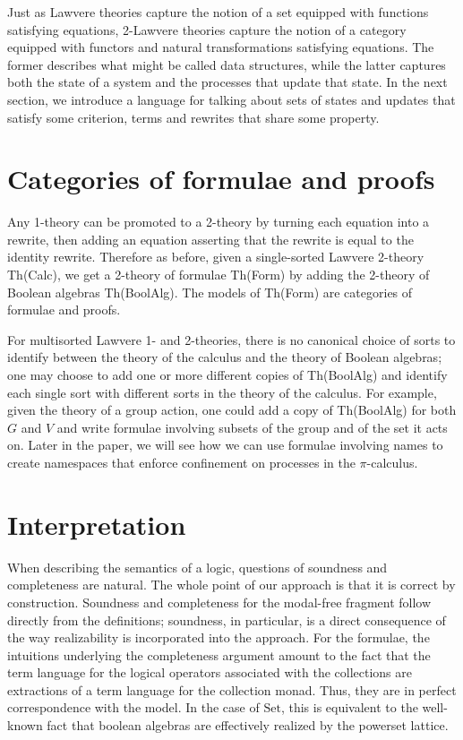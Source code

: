 \documentclass{llncs}
\newcommand{\Set}{\mathrm{Set}}
\begin{document}
Just as Lawvere theories capture the notion of a set equipped with functions satisfying equations, 2-Lawvere theories capture the notion of a category equipped with functors and natural transformations satisfying equations.  The former describes what might be called data structures, while the latter captures both the state of a system and the processes that update that state.  In the next section, we introduce a language for talking about sets of states and updates that satisfy some criterion, terms and rewrites that share some property.

\section{Categories of formulae and proofs}

Any 1-theory can be promoted to a 2-theory by turning each equation into a rewrite, then adding an equation asserting that the rewrite is equal to the identity rewrite.  Therefore as before, given a single-sorted Lawvere 2-theory Th(Calc), we get a 2-theory of formulae Th(Form) by adding the 2-theory of Boolean algebras Th(BoolAlg).  The models of Th(Form) are categories of formulae and proofs.

For multisorted Lawvere 1- and 2-theories, there is no canonical choice of sorts to identify between the theory of the calculus and the theory of Boolean algebras; one may choose to add one or more different copies of Th(BoolAlg) and identify each single sort with different sorts in the theory of the calculus.  For example, given the theory of a group action, one could add a copy of Th(BoolAlg) for both $G$ and $V$ and write formulae involving subsets of the group and of the set it acts on.  Later in the paper, we will see how we can use formulae involving names to create namespaces that enforce confinement on processes in the $\pi$-calculus.

\section{Interpretation}

When describing the semantics of a logic, questions of soundness and
completeness are natural.  The whole point of our approach is that it
is correct by construction.  Soundness and completeness for the
modal-free fragment follow directly from the definitions; soundness,
in particular, is a direct consequence of the way realizability is
incorporated into the approach.  For the formulae, the intuitions
underlying the completeness argument amount to the fact that the term
language for the logical operators associated with the collections are
extractions of a term language for the collection monad.  Thus, they
are in perfect correspondence with the model.  In the case of $\Set$,
this is equivalent to the well-known fact that boolean algebras are
effectively realized by the powerset lattice.
\end{document}
